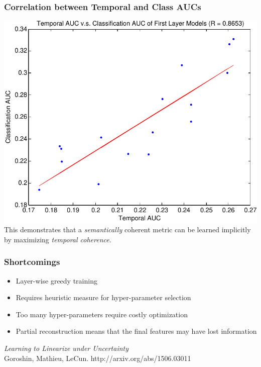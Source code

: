 \documentclass{beamer}
\begin{document}
\begin{frame}
\frametitle{Correlation between Temporal and Class AUCs}
\centering
\includegraphics[scale=0.5]{./Figures/Project1/scatter-crop.pdf}\\
This demonstrates that a \emph{semantically} coherent metric can be learned implicitly by maximizing \emph{temporal coherence}.  
\end{frame} 

\begin{frame}
\frametitle{Shortcomings}
\begin{itemize}
\item{Layer-wise greedy training} 
\item{Requires heuristic measure for hyper-parameter selection} 
\item{Too many hyper-parameters require costly optimization} 
\item{Partial reconstruction means that the final features may have lost information}
\end{itemize} 
\end{frame} 

\begin{frame}
\begin{center} 
\huge \color{blue} \emph{Learning to Linearize under Uncertainty}
\\ \vspace{2.5cm} 
\small{Goroshin, Mathieu, LeCun. http://arxiv.org/abs/1506.03011 } 
\end{center} 
\end{frame}
\end{document}

